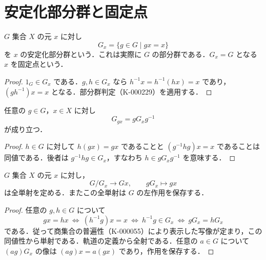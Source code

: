 \section{安定化部分群と固定点}
\begin{defn}[安定化部分群と固定点]
$G$ 集合 $X$ の元 $x$ に対し
\[
G_x=\{g\in G\mid gx=x\}
\]
を $x$ の安定化部分群という．これは実際に $G$ の部分群である．$G_x=G$ となる $x$ を固定点という．
\end{defn}
\begin{proof}
$1_G\in G_x$ である．$g,h\in G_x$ なら $h^{-1}x=h^{-1}(hx)=x$ であり，$(gh^{-1})x=x$ となる．部分群判定（K-000229）を適用する．
\end{proof}
\begin{prop}[同一軌道の安定化部分群]
任意の $g\in G$，$x\in X$ に対し
\[
G_{gx}=gG_xg^{-1}
\]
が成り立つ．
\end{prop}
\begin{proof}
$h\in G$ に対して $h(gx)=gx$ であることと $(g^{-1}hg)x=x$ であることは同値である．後者は $g^{-1}hg\in G_x$，すなわち $h\in gG_xg^{-1}$ を意味する．
\end{proof}
\begin{thm}[軌道・安定化部分群定理]
$G$ 集合 $X$ の元 $x$ に対し，
\[
G/G_x\longrightarrow Gx,\qquad gG_x\longmapsto gx
\]
は全単射を定める．またこの全単射は $G$ の左作用を保存する．
\end{thm}
\begin{proof}
任意の $g,h\in G$ について
\[
gx=hx\ \Longleftrightarrow\ (h^{-1}g)x=x
\ \Longleftrightarrow\ h^{-1}g\in G_x
\ \Longleftrightarrow\ gG_x=hG_x
\]
である．従って商集合の普遍性（K-000055）により表示した写像が定まり，この同値性から単射である．軌道の定義から全射である．任意の $a\in G$ について $(ag)G_x$ の像は $(ag)x=a(gx)$ であり，作用を保存する．
\end{proof}
